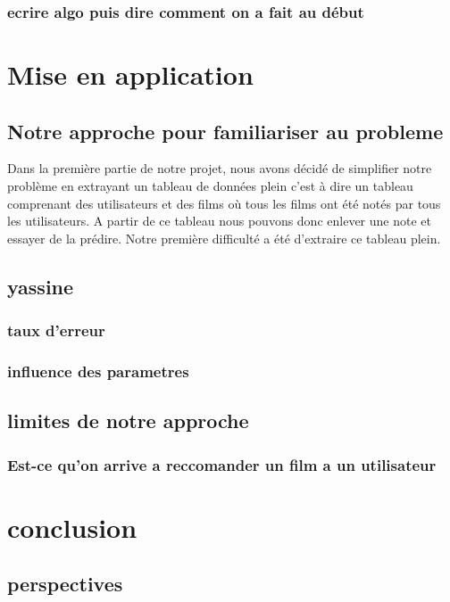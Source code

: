 \documentclass[a4paper,10pt]{article}
\begin{document}
\subsubsection{ecrire algo puis dire comment on a fait au début}
\section{Mise en application}
\subsection{Notre approche pour familiariser au probleme}
Dans la première partie de notre projet, nous avons décidé de simplifier notre problème en extrayant un tableau de données 
plein c'est à dire un tableau comprenant des utilisateurs et des films où tous les films ont été notés par tous les utilisateurs. 
A partir de ce tableau nous pouvons donc enlever une note et essayer de la prédire. 
Notre première difficulté a été d'extraire ce tableau plein.
\subsection{yassine}
\subsubsection{taux d'erreur}
\subsubsection{influence des parametres}
\subsection{limites de notre approche}
\subsubsection{Est-ce qu'on arrive a reccomander un film a un utilisateur}
\section{conclusion}

\subsection{perspectives}
\end{document}
